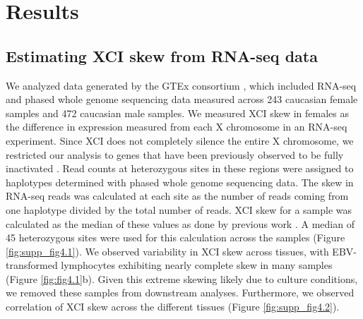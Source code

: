 \section{Results}

\subsection{Estimating XCI skew from RNA-seq data}

We analyzed data generated by the GTEx consortium \cite{GTEx_Consortium2020-xx}, which included RNA-seq and phased whole genome sequencing data measured across 243 caucasian female samples and 472 caucasian male samples. We measured XCI skew in females as the difference in expression measured from each X chromosome in an RNA-seq experiment. Since XCI does not completely silence the entire X chromosome, we restricted our analysis to genes that have been previously observed to be fully inactivated \cite{Carrel2005-zm,Cotton2013-jl,Tukiainen2017-xm}. Read counts at heterozygous sites in these regions were assigned to haplotypes determined with phased whole genome sequencing data. The skew in RNA-seq reads was calculated at each site as the number of reads coming from one haplotype divided by the total number of reads. XCI skew for a sample was calculated as the median of these values as done by previous work \cite{Shvetsova2019-re}. A median of 45 heterozygous sites were used for this calculation across the samples (Figure \ref{fig:supp_fig4.1}). We observed variability in XCI skew across tissues, with EBV-transformed lymphocytes exhibiting nearly complete skew in many samples (Figure \ref{fig:fig4.1}b).  Given this extreme skewing likely due to culture conditions, we removed these samples from downstream analyses. Furthermore, we observed correlation of XCI skew across the different tissues (Figure \ref{fig:supp_fig4.2}).




